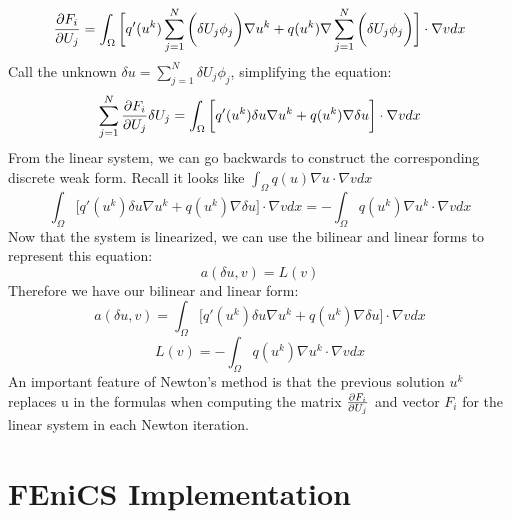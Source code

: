 \documentclass[12pt,3p]{article}
\begin{document}
\begin{equation*}
\pdv{F_i}{U_j} = \int_{\Omega} \bigg[ q'(u^k) \sum_{j = 1}^N \bigg( \delta U_j \phi_j \bigg) \nabla u^k + q(u^k)  \nabla \sum_{j = 1}^N \bigg( \delta U_j \phi_j \bigg) \bigg] \cdot \nabla v dx
\end{equation*}
Call the unknown $\delta u = \sum_{j = 1}^N \delta U_j \phi_j$, simplifying the equation: 
\begin{equation*}
\sum_{j = 1}^N \pdv{F_i}{U_j} \delta U_j  = \int_{\Omega} \bigg[ q'(u^k) \delta u \nabla u^k + q(u^k)  \nabla \delta u \bigg] \cdot \nabla v dx
\end{equation*}
From the linear system, we can go backwards to construct the corresponding discrete weak form. 
Recall it looks like $\int_{\Omega} q(u) \nabla u \cdot \nabla v dx$
\begin{equation}\label{disWeakForm}
\int_{\Omega} \bigg[ q'(u^k) \delta u \nabla u^k + q(u^k)  \nabla \delta u \bigg] \cdot \nabla v dx =
- \int_{\Omega} q(u^k) \nabla u^k \cdot \nabla v dx
\end{equation}
Now that the system is linearized, we can use the bilinear and linear forms to represent this equation:
\begin{equation}\label{standForm}
a(\delta u, v) = L(v) 
\end{equation}
Therefore we have our bilinear and linear form: 
\begin{equation}\label{bilinear}
a(\delta u, v) = \int_{\Omega} \bigg[ q'(u^k) \delta u \nabla u^k + q(u^k)  \nabla \delta u \bigg] \cdot \nabla v dx
\end{equation}
\begin{equation}\label{linear}
L(v) = - \int_{\Omega} q(u^k) \nabla u^k \cdot \nabla v dx
\end{equation}
An important feature of Newton's method is that the previous solution $u^k$ replaces u in the formulas when computing the matrix $\pdv{F_i}{U_j}$ and vector $F_i$ for the linear system in each Newton iteration.


\section{FEniCS Implementation}
\end{document}
